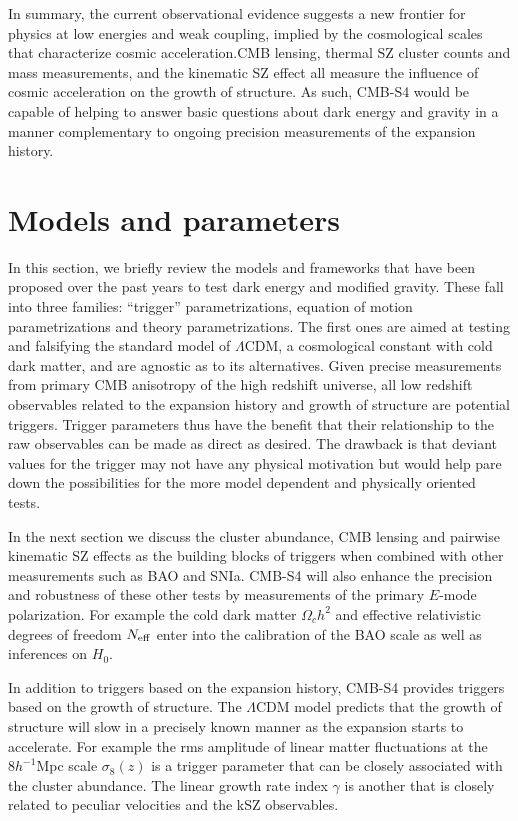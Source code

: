In summary, the current observational evidence suggests a new frontier for physics at low energies and weak coupling, implied by the cosmological scales that characterize cosmic acceleration.CMB lensing, thermal SZ cluster counts and mass measurements, and the kinematic SZ effect  all measure the influence of cosmic acceleration on the growth of 
structure.   As such, CMB-S4 would be capable of helping to answer basic questions about dark energy and gravity in a manner complementary to ongoing precision measurements of the expansion history.    %


\section{Models and parameters}


In this section, we  briefly review the models and frameworks that have been proposed over the past years to test dark energy and modified gravity.   These fall into 
three families: ``trigger'' parametrizations, equation of motion parametrizations and theory parametrizations. The first ones are aimed at testing and falsifying the standard model
of $\Lambda$CDM, a cosmological constant with cold dark matter, and are agnostic as to its 
alternatives.  Given precise measurements from primary CMB anisotropy of the high redshift universe, all low redshift observables related to the expansion history and growth of
structure are potential triggers.  Trigger parameters thus have the benefit that their relationship to the raw observables can be made as direct as desired.   The drawback is 
that deviant values for the trigger may not have any physical motivation but 
would help pare down the possibilities for the more model
dependent and physically oriented tests.  


  In the next section we discuss the cluster abundance,
 CMB lensing and pairwise kinematic SZ effects as the building blocks of triggers when
 combined with other measurements such as BAO and SNIa.   CMB-S4 will also enhance the precision and robustness
 of these other tests by measurements of the primary $E$-mode polarization.   For example
 the cold dark matter $\Omega_c h^2$ and effective relativistic degrees of freedom $N_{\rm eff}$ enter into the calibration of the BAO scale as well as inferences on $H_0$. 
 
In addition to triggers based on the expansion history, CMB-S4 provides triggers based
on the growth of structure.  The $\Lambda$CDM model predicts that the growth of structure
will slow in a precisely known manner as the expansion starts to accelerate.   
For example the rms amplitude of linear matter fluctuations at the $8 h^{-1}$Mpc
scale $\sigma_8(z)$ is a trigger parameter that can be closely associated with the 
cluster abundance.   The linear growth rate index $\gamma$ is another that is closely related
to peculiar velocities and the kSZ observables.   

